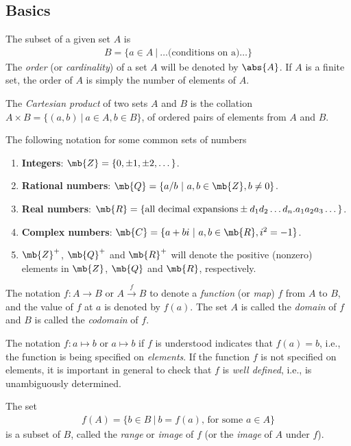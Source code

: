 \subsection{Basics}
The subset of a given set $A$ is
\begin{align*}
    B = \{a\in A\ |\ \dots\text{(conditions on a)}\dots\}
\end{align*}
The {\sl order} (or {\sl cardinality}) of a set $A$ will be denoted by $\abs{A}$.
If $A$ is a finite set, the order of $A$ is simply the number of elements of $A$.

The {\sl Cartesian product} of two sets $A$ and $B$ is the collation $A\times B = \{(a,b)\ |\ a\in A,b\in B\}$,
of ordered pairs of elements from $A$ and $B$.

The following notation for some common sets of numbers
\begin{enumerate}[leftmargin=20pt, itemsep=0pt, topsep=3pt]
    \item {\bf Integers}: $\mb{Z} = \{0,\pm 1, \pm 2,\dots\}$.
    \item {\bf Rational numbers}: $\mb{Q} = \{a/b\ |\ a,b\in\mb{Z},b\neq 0\}$.
    \item {\bf Real numbers}: $\mb{R} = \{\text{all decimal expansions} \pm d_{1}d_{2}\dots d_{n}.a_{1}a_{2}a_{3}\dots\}$.
    \item {\bf Complex numbers}: $\mb{C} = \{a+bi\ |\ a,b\in\mb{R},i^{2}=-1\}$.
    \item $\mb{Z}^{+}$, $\mb{Q}^{+}$ and $\mb{R}^{+}$ will denote the positive (nonzero) elements in $\mb{Z}$, $\mb{Q}$ and $\mb{R}$, respectively.
\end{enumerate}
The notation $f:A\to B$ or $A\xrightarrow{\,f\,} B$ to denote a {\sl function} (or {\sl map}) $f$ from $A$ to $B$,
and the value of $f$ at $a$ is denoted by $f(a)$.
The set $A$ is called the {\sl domain} of $f$ and
$B$ is called the {\sl codomain} of $f$.

The notation $f:a\mapsto b$ or $a\mapsto b$ if $f$ is understood indicates that $f(a)=b$, i.e., the function is being specified on {\sl elements}.
If the function $f$ is not specified on elements, it is important in general to check
that $f$ is {\sl well defined}, i.e., is unambiguously determined.

The set
\begin{align*}
    f(A) = \{b\in B\ |\ b=f(a)\text{, for some }a\in A\}
\end{align*}
is a subset of $B$, called the {\sl range} or {\sl image} of $f$ (or the {\sl image} of $A$ under $f$).

